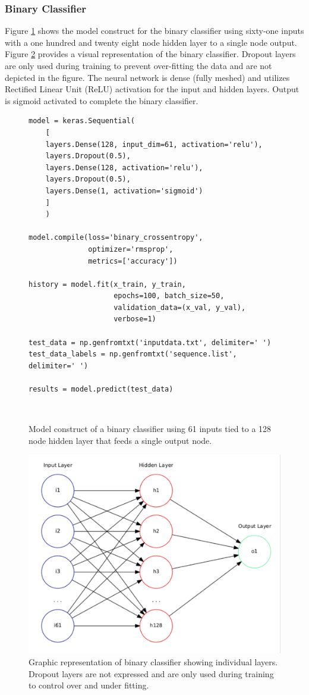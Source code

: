 \subsubsection{Binary Classifier}
Figure \ref{fig:binaryclassifier} shows the model construct for the binary classifier using sixty-one inputs with a one hundred and twenty eight node hidden layer to a single node output. Figure \ref{fig:binary-ann} provides a visual representation of the binary classifier. Dropout layers are only used during training to prevent over-fitting the data and are not depicted in the figure. The neural network is dense (fully meshed) and utilizes Rectified Linear Unit (ReLU) activation for the input and hidden layers. Output is sigmoid activated to complete the binary classifier.
\begin{figure}[h!]
	\lstset{style=customc, language=Python}
	\begin{lstlisting}
model = keras.Sequential(
    [
    layers.Dense(128, input_dim=61, activation='relu'),
    layers.Dropout(0.5),
    layers.Dense(128, activation='relu'),
    layers.Dropout(0.5),
    layers.Dense(1, activation='sigmoid')
    ]
    )

model.compile(loss='binary_crossentropy',
              optimizer='rmsprop',
              metrics=['accuracy'])

history = model.fit(x_train, y_train, 
                    epochs=100, batch_size=50,
                    validation_data=(x_val, y_val),
                    verbose=1)

test_data = np.genfromtxt('inputdata.txt', delimiter=' ')
test_data_labels = np.genfromtxt('sequence.list', delimiter=' ')

results = model.predict(test_data)
	\end{lstlisting}
	\caption{Model construct of a binary classifier using 61 inputs tied to a 128 node hidden layer that feeds a single output node.}\
	\label{fig:binaryclassifier}
\end{figure}

\begin{figure}
\centering
\includegraphics[width=0.7\linewidth]{images/binary-ann}
\caption{Graphic representation of binary classifier showing individual layers. Dropout layers are not expressed and are only used during training to control over and under fitting.}
\label{fig:binary-ann}
\end{figure}

